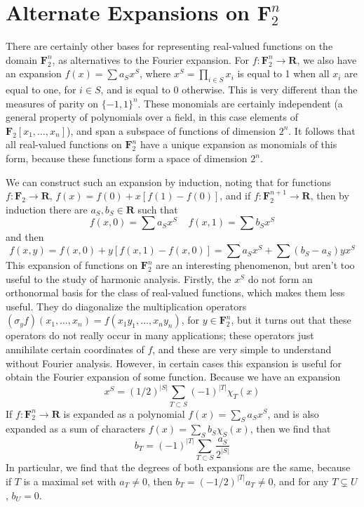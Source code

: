 \section{Alternate Expansions on $\mathbf{F}_2^n$}

There are certainly other bases for representing real-valued functions on the domain $\mathbf{F}_2^n$, as alternatives to the Fourier expansion. For $f: \mathbf{F}_2^n \to \mathbf{R}$, we also have an expansion $f(x) = \sum a_S x^S$, where $x^S = \prod_{i \in S} x_i$ is equal to 1 when all $x_i$ are equal to one, for $i \in S$, and is equal to 0 otherwise. This is very different than the measures of parity on $\{ -1, 1 \}^n$. These monomials are certainly independent (a general property of polynomials over a field, in this case elements of $\mathbf{F}_2[x_1, \dots, x_n]$), and span a subspace of functions of dimension $2^n$. It follows that all real-valued functions on $\mathbf{F}_2^n$ have a unique expansion as monomials of this form, because these functions form a space of dimension $2^n$.

We can construct such an expansion by induction, noting that for functions $f: \mathbf{F}_2 \to \mathbf{R}$, $f(x) = f(0) + x[f(1) - f(0)]$, and if $f: \mathbf{F}_2^{n+1} \to \mathbf{R}$, then by induction there are $a_S, b_S \in \mathbf{R}$ such that
%
\[ f(x,0) = \sum a_S x^S\ \ \ \ \ f(x,1) = \sum b_S x^S \]
%
and then
%
\[ f(x,y) = f(x,0) + y[f(x,1) - f(x,0)] = \sum a_S x^S + \sum (b_S - a_S) yx^S \]
%
This expansion of functions on $\mathbf{F}_2^n$ are an interesting phenomenon, but aren't too useful to the study of harmonic analysis. Firstly, the $x^S$ do not form an orthonormal basis for the class of real-valued functions, which makes them less useful. They do diagonalize the multiplication operators $(\sigma_y f)(x_1, \dots, x_n) = f(x_1y_1, \dots, x_ny_n)$, for $y \in \mathbf{F}^n_2$, but it turns out that these operators do not really occur in many applications; these operators just annihilate certain coordinates of $f$, and these are very simple to understand without Fourier analysis. However, in certain cases this expansion is useful for obtain the Fourier expansion of some function. Because we have an expansion
%
\[ x^S = \left( 1/2 \right)^{|S|} \sum_{T \subset S} (-1)^{|T|} \chi_T(x) \]
%
If $f: \mathbf{F}_2^n \to \mathbf{R}$ is expanded as a polynomial $f(x) = \sum_S a_S x^S$, and is also expanded as a sum of characters $f(x) = \sum_S b_S \chi_S(x)$, then we find that
%
\[ b_T = (-1)^{|T|} \sum_{T \subset S} \frac{a_S}{2^{|S|}}  \]
%
In particular, we find that the degrees of both expansions are the same, because if $T$ is a maximal set with $a_T \neq 0$, then $b_T = (-1/2)^{|T|} a_T \neq 0$, and for any $T \subsetneq U$, $b_U = 0$.

